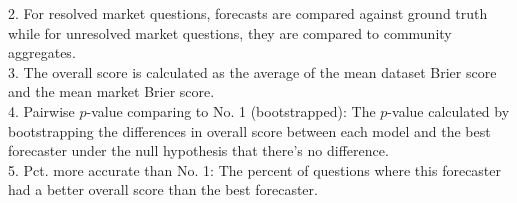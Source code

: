 \begin{table}[ht!]
\begin{minipage}{\textwidth}
{    \vspace{-2mm} %
    2. For resolved market questions, forecasts are compared against ground truth while for unresolved market questions, they are compared to community aggregates.\\
    \vspace{-2mm} %
    3. The overall score is calculated as the average of the mean dataset Brier score and the mean market Brier score.\\
    \vspace{-2mm} %
    4. Pairwise $p$-value comparing to No. 1 (bootstrapped): The $p$-value calculated by bootstrapping the differences in overall score between each model and the best\\ \vspace{-2mm} forecaster under the null hypothesis that there's no difference.\\
    \vspace{-2mm}
    5. Pct. more accurate than No. 1: The percent of questions where this forecaster had a better overall score than the best forecaster.\\
}
\end{minipage}
\end{table}
